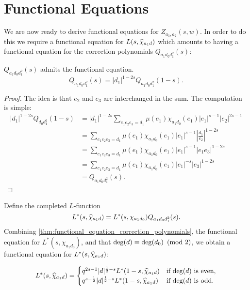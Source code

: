 \documentclass[12pt,reqno,oneside]{amsart}
\begin{document}
\section{Functional Equations}
    We are now ready to derive functional equations for $Z_{a_{1},a_{2}}(s,w)$. In order to do this we require a functional equation for $L(s,\widehat{\chi}_{a_{1}d})$ which amounts to having a functional equation for the correction polynomials $Q_{a_{1}d_{0}d_{1}^{2}}(s)$:

    \begin{theorem}\label{thm:functional_equation_correction_polynomials}
        $Q_{a_{1}d_{0}d_{1}^{2}}(s)$ admits the functional equation.
        \[
            Q_{a_{1}d_{0}d_{1}^{2}}(s) = |d_{1}|^{1-2s}Q_{a_{1}d_{0}d_{1}^{2}}(1-s).
        \]
    \end{theorem}
    \begin{proof}
        The idea is that $e_{2}$ and $e_{3}$ are interchanged in the sum. The computation is simple:
        \begin{align*}
            |d_{1}|^{1-2s}Q_{d_{0}d_{1}^{2}}(1-s) &= |d_{1}|^{1-2s}\sum_{e_{1}e_{2}e_{3} = d_{1}}\mu(e_{1})\chi_{a_{1}d_{0}}(e_{1})|e_{1}|^{s-1}|e_{2}|^{2s-1} \\
            &= \sum_{e_{1}e_{2}e_{3} = d_{1}}\mu(e_{1})\chi_{a_{1}d_{0}}(e_{1})|e_{1}|^{s-1}\left|\frac{d_{1}}{e_{2}}\right|^{1-2s} \\
            &= \sum_{e_{1}e_{2}e_{3} = d_{1}}\mu(e_{1})\chi_{a_{1}d_{0}}(e_{1})|e_{1}|^{s-1}|e_{1}e_{3}|^{1-2s} \\
            &= \sum_{e_{1}e_{2}e_{3} = d_{1}}\mu(e_{1})\chi_{a_{1}d_{0}}(e_{1})|e_{1}|^{-s}|e_{3}|^{1-2s} \\
            &= Q_{a_{1}d_{0}d_{1}^{2}}(s).
        \end{align*}
    \end{proof}

    Define the completed $L$-function
    \[
        L^{\ast}(s,\widehat{\chi}_{a_{1}d}) = L^{\ast}(s,\chi_{a_{1}d_{0}})Q_{a_{1}d_{0}d_{1}^{2}}(s).
    \]
    Combining \cref{thm:functional_equation_correction_polynomials}, the functional equation for $L^{\ast}(s,\chi_{a_{1}d_{0}})$, and that $\deg(d) \equiv \deg(d_{0}) \ \left(\text{mod }2\right)$, we obtain a functional equation for $L^{\ast}(s,\widehat{\chi}_{a_{1}d})$:

    \[
        L^{\ast}(s,\widehat{\chi}_{a_{1}d}) = \begin{cases} q^{2s-1}|d|^{\frac{1}{2}-s}L^{\ast}(1-s,\widehat{\chi}_{a_{1}d}) & \text{if $\deg(d)$ is even}, \\ q^{s-\frac{1}{2}}|d|^{\frac{1}{2}-s}L^{\ast}(1-s,\widehat{\chi}_{a_{1}d}) & \text{if $\deg(d)$ is odd}. \end{cases}
    \]
\end{document}
